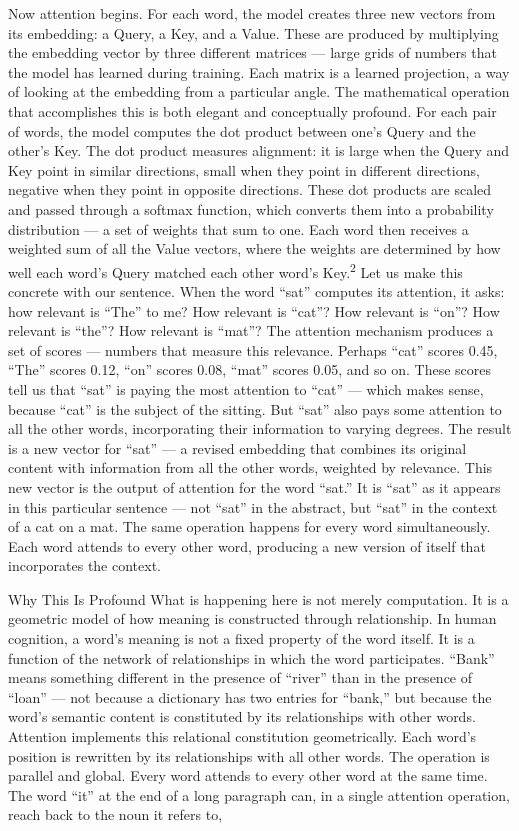 Now attention begins. For each word, the model creates three new vectors from its embedding: a Query, a Key, and a Value. These are produced by multiplying the embedding vector by three different matrices — large grids of numbers that the model has learned during training. Each matrix is a learned projection, a way of looking at the embedding from a particular angle. The mathematical operation that accomplishes this is both elegant and conceptually profound. For each pair of words, the model computes the dot product between one’s Query and the other’s Key. The dot product measures alignment: it is large when the Query and Key point in similar directions, small when they point in different directions, negative when they point in opposite directions. These dot products are scaled and passed through a softmax function, which converts them into a probability distribution — a set of weights that sum to one. Each word then receives a weighted sum of all the Value vectors, where the weights are determined by how well each word’s Query matched each other word’s Key.\textsuperscript{2} Let us make this concrete with our sentence. When the word “sat” computes its attention, it asks: how relevant is “The” to me? How relevant is “cat”? How relevant is “on”? How relevant is “the”? How relevant is “mat”? The attention mechanism produces a set of scores — numbers that measure this relevance. Perhaps “cat” scores 0.45, “The” scores 0.12, “on” scores 0.08, “mat” scores 0.05, and so on. These scores tell us that “sat” is paying the most attention to “cat” — which makes sense, because “cat” is the subject of the sitting. But “sat” also pays some attention to all the other words, incorporating their information to varying degrees. The result is a new vector for “sat” — a revised embedding that combines its original content with information from all the other words, weighted by relevance. This new vector is the output of attention for the word “sat.” It is “sat” as it appears in this particular sentence — not “sat” in the abstract, but “sat” in the context of a cat on a mat. The same operation happens for every word simultaneously. Each word attends to every other word, producing a new version of itself that incorporates the context.

Why This Is Profound What is happening here is not merely computation. It is a geometric model of how meaning is constructed through relationship. In human cognition, a word’s meaning is not a fixed property of the word itself. It is a function of the network of relationships in which the word participates. “Bank” means something different in the presence of “river” than in the presence of “loan” — not because a dictionary has two entries for “bank,” but because the word’s semantic content is constituted by its relationships with other words. Attention implements this relational constitution geometrically. Each word’s position is rewritten by its relationships with all other words. The operation is parallel and global. Every word attends to every other word at the same time. The word “it” at the end of a long paragraph can, in a single attention operation, reach back to the noun it refers to,

